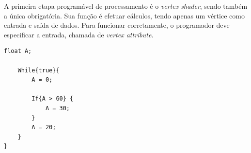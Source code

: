 A primeira etapa programável de processamento é o \textit{vertex shader}, sendo também a única obrigatória. Sua função é efetuar cálculos, tendo apenas um vértice como entrada e saída de dados. Para funcionar corretamente, o programador deve especificar a entrada, chamada de \textit{vertex attribute}.

\begin{lstlisting}[caption="AAAAAA"]
	float A;
	
	While{true}{	
		A = 0;
		
		If{A > 60} {
			A = 30;
		}
		A = 20;
	}
}
\end{lstlisting}

\label{alg:vertexattribute}